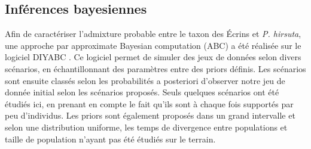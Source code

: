 \subsection{Inférences bayesiennes}

Afin de caractériser l'admixture probable entre le taxon des Écrins et \textit{P. hirsuta}, une approche par approximate Bayesian computation (ABC) a été réalisée sur le logiciel DIYABC \citep{Cornuet2014}. 
Ce logiciel permet de simuler des jeux de données selon divers scénarios, en échantillonnant des paramètres entre des priors définis. 
Les scénarios sont ensuite classés selon les probabilités a posteriori d'observer notre jeu de donnée initial selon les scénarios proposés. 
Seuls quelques scénarios ont été étudiés ici, en prenant en compte le fait qu'ils sont à chaque fois supportés par peu d'individus. 
Les priors sont également proposés dans un grand intervalle et selon une distribution uniforme, les temps de divergence entre populations et taille de population n'ayant pas été étudiés sur le terrain.

